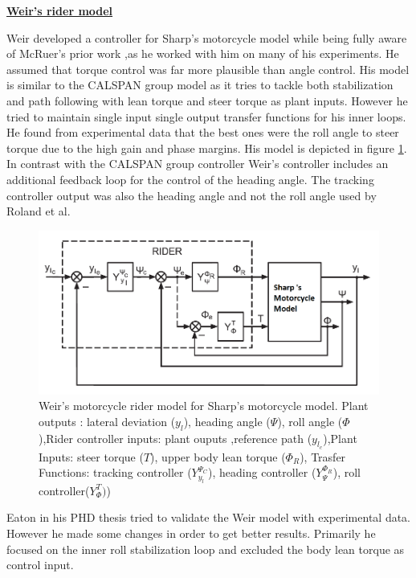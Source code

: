\bigbreak

\underline{\textbf{Weir’s rider model \cite{weir1973manual}}}
\newline

Weir developed a controller for Sharp’s motorcycle model\cite{sharp1985lateral} while being fully aware of McRuer’s prior work ,as he worked with him on many of his experiments. He assumed that torque control was far more plausible than angle control. His model is similar to the CALSPAN group model as it tries to tackle both stabilization and path following with lean torque and steer torque as plant inputs. However he tried to maintain single input single output transfer functions for his inner loops. He found from experimental data that  the best ones were the roll angle to steer torque due to the high gain and phase margins. His model is depicted in figure \ref{fig:figure6}. In contrast with the CALSPAN group controller Weir’s controller includes an additional  feedback loop for the control of the heading angle. The tracking controller output was also the heading angle and not the roll angle used by Roland et al.
\begin{figure}[ht]
    \centering
    \includegraphics[scale=1.0]{images/weir_block.png}
    \caption{Weir's motorcycle rider model for Sharp’s motorcycle model. Plant outputs : lateral deviation (\ensuremath{y_l}), heading angle (\ensuremath{\Psi}), roll angle (\ensuremath{\Phi}),Rider controller inputs: plant ouputs ,reference path (\ensuremath{y_{l_c}}),Plant Inputs: steer torque (\ensuremath{T}), upper body lean torque (\ensuremath{\Phi_R}),  Trasfer Functions: tracking controller (\ensuremath{Y^{\Psi_C}_{y_l}}), heading controller  (\ensuremath{Y^{\Phi_R}_{\Psi}}), roll controller(\ensuremath{Y^{T}_{\Phi})})}
    \label{fig:figure6}
\end{figure}
\par
Eaton in his PHD thesis\cite{eaton1987man}  tried to validate the Weir model with experimental data. However he made some changes in order to get better results. Primarily he  focused on the inner roll stabilization loop and excluded the body lean torque as control input.
